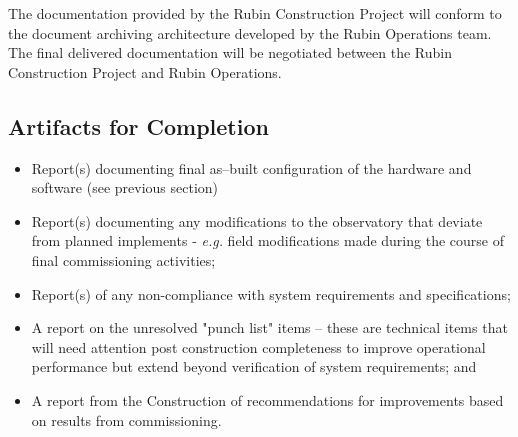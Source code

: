 \begin{itemize}
The documentation provided by the Rubin Construction Project will conform to the document archiving architecture developed by the Rubin Operations team.  The final delivered documentation will be negotiated between the Rubin Construction Project and Rubin Operations.

\subsection{Artifacts for Completion}

\begin{itemize}

	\item Report(s) documenting final as--built configuration of the hardware and software (see previous section)
	\item Report(s) documenting any modifications to the observatory that deviate from planned implements - {\it e.g.} field modifications made during the course of final commissioning activities;
	\item Report(s) of any non-compliance with system requirements and specifications;
	\item A report on the unresolved "punch list" items -- these are technical items that will need attention post construction completeness to improve operational performance but extend beyond verification of system requirements; and
	\item A report from the Construction of recommendations for improvements based on results from commissioning.
\end{itemize}

\end{itemize}
